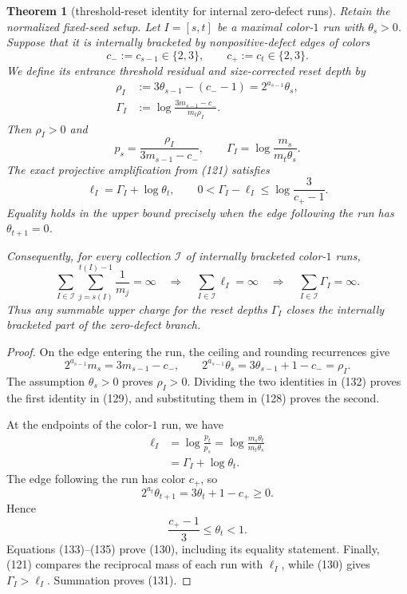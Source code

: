 \documentclass[11pt]{article}
\newtheorem{theorem}{Theorem}
\begin{document}
\begin{theorem}[threshold-reset identity for internal zero-defect runs]
Retain the normalized fixed-seed setup.  Let $I=[s,t]$ be a maximal
color-$1$ run with $\theta_s>0$.  Suppose that it is internally bracketed
by nonpositive-defect edges of colors
\[
  c_-:=c_{s-1}\in\{2,3\},
  \qquad
  c_+:=c_t\in\{2,3\}.
\tag{127}
\]
We define its entrance threshold residual and size-corrected reset depth by
\[
\begin{aligned}
  \rho_I&:=3\theta_{s-1}-(c_--1)
          =2^{a_{s-1}}\theta_s,\\
  \Gamma_I&:=
  \log\frac{3m_{s-1}-c_-}{m_t\rho_I}.
\end{aligned}
\tag{128}
\]
Then $\rho_I>0$ and
\[
\boxed{
  p_s=\frac{\rho_I}{3m_{s-1}-c_-},
  \qquad
  \Gamma_I=\log\frac{m_s}{m_t\theta_s}.}
\tag{129}
\]
The exact projective amplification from (121) satisfies
\[
\boxed{
  \ell_I=\Gamma_I+\log\theta_t,
  \qquad
  0<\Gamma_I-\ell_I
  \leq\log\frac3{c_+-1}.}
\tag{130}
\]
Equality holds in the upper bound precisely when the edge following the
run has $\theta_{t+1}=0$.

Consequently, for every collection $\mathcal I$ of internally bracketed
color-$1$ runs,
\[
  \sum_{I\in\mathcal I}\sum_{j=s(I)}^{t(I)-1}\frac1{m_j}=\infty
  \quad\Longrightarrow\quad
  \sum_{I\in\mathcal I}\ell_I=\infty
  \quad\Longrightarrow\quad
  \sum_{I\in\mathcal I}\Gamma_I=\infty.
\tag{131}
\]
Thus any summable upper charge for the reset depths $\Gamma_I$ closes the
internally bracketed part of the zero-defect branch.
\end{theorem}

\begin{proof}
On the edge entering the run, the ceiling and rounding recurrences give
\[
  2^{a_{s-1}}m_s=3m_{s-1}-c_-,
  \qquad
  2^{a_{s-1}}\theta_s
  =3\theta_{s-1}+1-c_-=\rho_I.
\tag{132}
\]
The assumption $\theta_s>0$ proves $\rho_I>0$.  Dividing the two
identities in (132) proves the first identity in (129), and substituting
them in (128) proves the second.

At the endpoints of the color-$1$ run, we have
\[
\begin{aligned}
  \ell_I
  &=\log\frac{p_t}{p_s}
    =\log\frac{m_s\theta_t}{m_t\theta_s}\\
  &=\Gamma_I+\log\theta_t.
\end{aligned}
\tag{133}
\]
The edge following the run has color $c_+$, so
\[
  2^{a_t}\theta_{t+1}=3\theta_t+1-c_+\geq0.
\tag{134}
\]
Hence
\[
  \frac{c_+-1}{3}\leq\theta_t<1.
\tag{135}
\]
Equations (133)--(135) prove (130), including its equality statement.
Finally, (121) compares the reciprocal mass of each run with $\ell_I$,
while (130) gives $\Gamma_I>\ell_I$.  Summation proves (131).
\end{proof}
\end{document}
